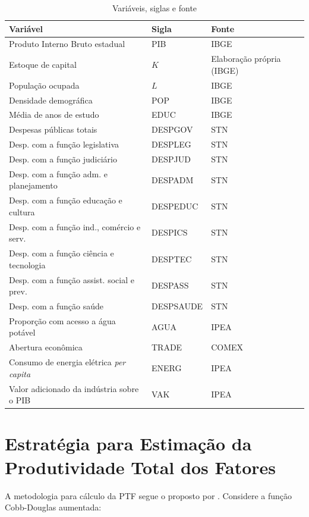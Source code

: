 \documentclass[
  12pt,
  a4paper,
  oneside,
  brazil,
  chapter=TITLE,
  section=TITLE
]{abntex2}
\begin{document}
\begin{table}[H]
  \centering
  \caption{Variáveis, siglas e fonte}
  \label{tab:variaveis}
  \begin{tabular}{lll}
    \toprule
    \textbf{Variável} & \textbf{Sigla} & \textbf{Fonte} \\
    \midrule
    Produto Interno Bruto estadual & PIB & IBGE \\
    Estoque de capital & $K$ & Elaboração própria (IBGE) \\
    População ocupada & $L$ & IBGE \\
    Densidade demográfica & POP & IBGE \\
    Média de anos de estudo & EDUC & IBGE \\
    Despesas públicas totais & DESPGOV & STN \\
    Desp. com a função legislativa & DESPLEG & STN \\
    Desp. com a função judiciário & DESPJUD & STN \\
    Desp. com a função adm. e planejamento & DESPADM & STN \\
    Desp. com a função educação e cultura & DESPEDUC & STN \\
    Desp. com a função ind., comércio e serv. & DESPICS & STN \\
    Desp. com a função ciência e tecnologia & DESPTEC & STN \\
    Desp. com a função assist. social e prev. & DESPASS & STN \\
    Desp. com a função saúde & DESPSAUDE & STN \\
    Proporção com acesso a água potável & AGUA & IPEA \\
    Abertura econômica & TRADE & COMEX \\
    Consumo de energia elétrica \textit{per capita} & ENERG & IPEA \\
    Valor adicionado da indústria sobre o PIB & VAK & IPEA \\
    \bottomrule
  \end{tabular}
\end{table}

\section{Estratégia para Estimação da Produtividade Total dos Fatores}

A metodologia para cálculo da PTF segue o proposto por . Considere a função Cobb-Douglas aumentada:
\end{document}
